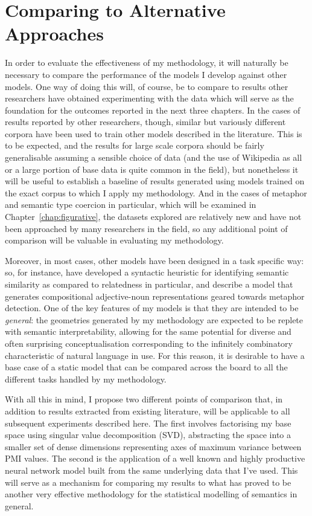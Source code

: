 \section{Comparing to Alternative Approaches}
In order to evaluate the effectiveness of my methodology, it will naturally be necessary to compare the performance of the models I develop against other models.  One way of doing this will, of course, be to compare to results other researchers have obtained experimenting with the data which will serve as the foundation for the outcomes reported in the next three chapters.  In the cases of results reported by other researchers, though, similar but variously different corpora have been used to train other models described in the literature.  This is to be expected, and the results for large scale corpora should be fairly generalisable assuming a sensible choice of data (and the use of Wikipedia as all or a large portion of base data is quite common in the field), but nonetheless it will be useful to establish a baseline of results generated using models trained on the exact corpus to which I apply my methodology.  And in the cases of metaphor and semantic type coercion in particular, which will be examined in Chapter~\ref{chap:figurative}, the datasets explored are relatively new and have not been approached by many researchers in the field, so any additional point of comparison will be valuable in evaluating my methodology.

Moreover, in most cases, other models have been designed in a task specific way: so, for instance, \cite{SchwartzEA2015} have developed a syntactic heuristic for identifying semantic similarity as compared to relatedness in particular, and \cite{GutierrezEA2016} describe a model that generates compositional adjective-noun representations geared towards metaphor detection.  One of the key features of my models is that they are intended to be \emph{general}: the geometries generated by my methodology are expected to be replete with semantic interpretability, allowing for the same potential for diverse and often surprising conceptualisation corresponding to the infinitely combinatory characteristic of natural language in use.  For this reason, it is desirable to have a base case of a static model that can be compared across the board to all the different tasks handled by my methodology.

With all this in mind, I propose two different points of comparison that, in addition to results extracted from existing literature, will be applicable to all subsequent experiments described here.  The first involves factorising my base space using singular value decomposition (SVD), abstracting the space into a smaller set of dense dimensions representing axes of maximum variance between PMI values.  The second is the application of a well known and highly productive neural network model built from the same underlying data that I've used.  This will serve as a mechanism for comparing my results to what has proved to be another very effective methodology for the statistical modelling of semantics in general.

